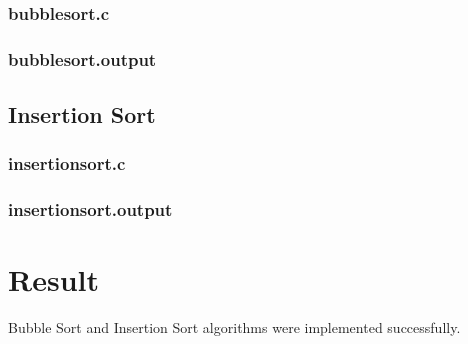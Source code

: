 \subsubsection{bubblesort.c}



\subsubsection{bubblesort.output}



\subsection{Insertion Sort}

\subsubsection{insertionsort.c}



\subsubsection{insertionsort.output}



\section{Result}
Bubble Sort and Insertion Sort algorithms were implemented successfully.
